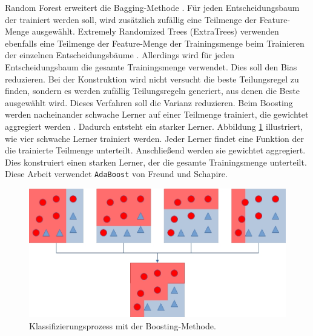 \newline
\newline
Random Forest erweitert die Bagging-Methode \cite{breiman2001random}. Für jeden Entscheidungsbaum der trainiert werden soll, wird zusätzlich zufällig eine Teilmenge der Feature-Menge ausgewählt.
\newline
\newline
Extremely Randomized Trees (ExtraTrees) verwenden ebenfalls eine Teilmenge der Feature-Menge der Trainingsmenge beim Trainieren der einzelnen Entscheidungsbäume \cite{geurts2006extremely}.
Allerdings wird für jeden Entscheidungsbaum die gesamte Trainingsmenge verwendet. Dies soll den Bias reduzieren. Bei der Konstruktion wird nicht versucht die beste Teilungsregel zu finden,
sondern es werden zufällig Teilungsregeln generiert, aus denen die Beste ausgewählt wird. Dieses Verfahren soll die Varianz reduzieren.
\newline
\newline
Beim Boosting werden nacheinander schwache Lerner auf einer Teilmenge trainiert, die gewichtet aggregiert werden \cite{freund1997decision}. Dadurch entsteht ein starker Lerner.
Abbildung \ref{fig:boosting} illustriert, wie vier schwache Lerner trainiert werden. Jeder Lerner findet eine Funktion der die trainierte Teilmenge unterteilt. Anschließend
werden sie gewichtet aggregiert. Dies konstruiert einen starken Lerner, der die gesamte Trainingsmenge unterteilt. Diese Arbeit verwendet \texttt{AdaBoost} \cite{freund1997decision} von Freund und Schapire.
\begin{figure}[h!]
    \centering
    \includegraphics[width=\linewidth]{images/boosting.jpg}
    \caption{Klassifizierungsprozess mit der Boosting-Methode.}
    \label{fig:boosting}
\end{figure}